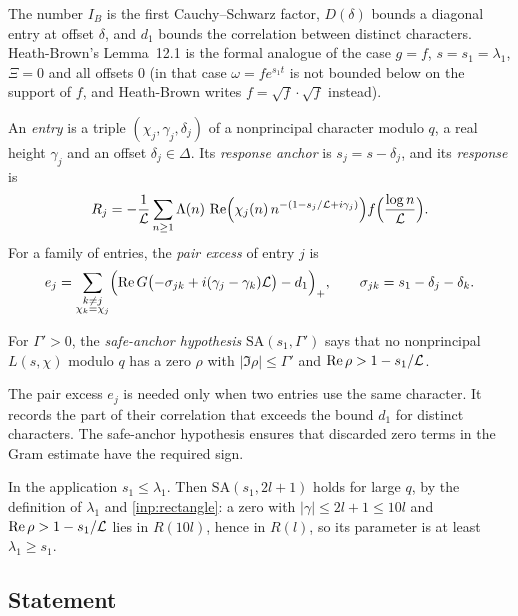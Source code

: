 The number $I_B$ is the first Cauchy--Schwarz factor, $D(\delta)$ bounds a diagonal
entry at offset $\delta$, and $d_1$ bounds the correlation between distinct characters.
Heath-Brown's
Lemma~12.1 is the formal analogue of the case $g=f$, $s=s_1=\lambda_1$, $\Xi=0$ and all offsets $0$ (in that
case $\omega=fe^{s_1t}$ is not bounded below on the support of $f$, and Heath-Brown writes $f=\sqrt
f\cdot\sqrt f$ instead).

\begin{definition}\label{def:entries}
An \emph{entry} is a triple $(\chi_j,\gamma_j,\delta_j)$ of a nonprincipal character modulo $q$, a
real height $\gamma_j$ and an offset $\delta_j\in\Delta$. Its \emph{response anchor} is
$s_j=s-\delta_j$, and its \emph{response} is
\[
  R_j=-\frac1{\mathcal{L}}\sum_{n\ge1}\Lambda(n)\,\operatorname{Re}\Bigl(\chi_j(n)\,n^{-(1-s_j/\mathcal{L}+i\gamma_j)}\Bigr)
  f\Bigl(\frac{\log n}{\mathcal{L}}\Bigr).
\]
For a family of entries, the \emph{pair excess} of entry $j$ is
\[
  e_j=\sum_{\substack{k\ne j\\ \chi_k=\chi_j}}\Bigl(\operatorname{Re} G\bigl(-\sigma_{jk}+i(\gamma_j-\gamma_k)\mathcal{L}\bigr)
  -d_1\Bigr)_+,\qquad \sigma_{jk}=s_1-\delta_j-\delta_k .
\]
\end{definition}

\begin{definition}\label{def:safeanchor}
For $\Gamma'>0$, the \emph{safe-anchor hypothesis} $\mathrm{SA}(s_1,\Gamma')$ says that no nonprincipal
$L(s,\chi)$ modulo $q$ has a zero $\rho$ with $|\Im\rho|\le\Gamma'$ and $\operatorname{Re}\rho>1-s_1/\mathcal{L}$.
\end{definition}

The pair excess $e_j$ is needed only when two entries use the same character. It records
the part of their correlation that exceeds the bound $d_1$ for distinct characters.
The safe-anchor hypothesis ensures that discarded zero terms in the Gram estimate have
the required sign.

In the application $s_1\le\lambda_1$. Then $\mathrm{SA}(s_1,2l+1)$ holds for large $q$, by the
definition of $\lambda_1$ and \cref{inp:rectangle}: a zero with $|\gamma|\le2l+1\le10l$ and
$\operatorname{Re}\rho>1-s_1/\mathcal{L}$ lies in $R(10l)$, hence in $R(l)$, so its parameter is at least
$\lambda_1\ge s_1$.

\subsection{Statement}

